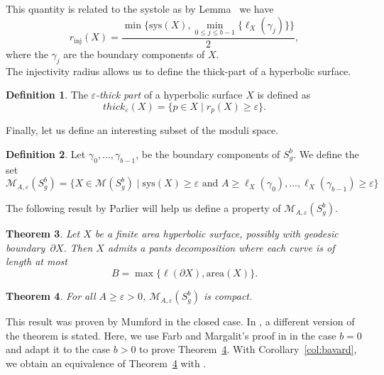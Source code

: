 \documentclass[a4paper,12pt]{article}
\newtheorem{theorem}{Theorem}[section]
\theoremstyle{definition}
\newtheorem{definition}[theorem]{Definition}
\theoremstyle{remark}
\begin{document}
This quantity is related to the systole as by Lemma~\cite[4.8 chap.I]{Hummel} we have 
\[
    r_{\mbox{inj}}(X)= \frac{\min\{ \mathrm{sys}(X) , \min_{0 \leqslant j \leqslant b-1}\{ \ell_X(\gamma_j) \} \}}{2}, 
\]
where the $\gamma_j$ are the boundary components of $X$.\\

The injectivity radius allows us to define the thick-part of a hyperbolic surface.
\begin{definition}
    The \emph{$\varepsilon$-thick part} of a hyperbolic surface $X$ is defined as
    \[
        thick_\varepsilon(X) = \{ p \in X \mid r_p(X) \geqslant \varepsilon  \}.
    \]
\end{definition}



Finally, let us define an interesting subset of the moduli space.

\begin{definition}
    Let $\gamma_0,...,\gamma_{b-1}$, be the boundary components of $S_g^b$. We define the set
    \[
        \mathcal{M}_{A, \varepsilon}(S_g^b) = \{X \in \mathcal{M}(S_g^b) \mid \mathrm{sys}(X) \geqslant \varepsilon \text{ and } A \geqslant \ell_X(\gamma_0),...,\ell_X(\gamma_{b-1}) \geqslant \varepsilon \}
    \]
\end{definition}

The following result by Parlier \cite{bers} will help us define a property of $\mathcal{M}_{A, \varepsilon}(S_g^b)$.

\begin{theorem}\label{theorem:Bers}
    Let $X$ be a finite area hyperbolic surface, possibly with geodesic boundary~$\partial X$. Then $X$ admits a pants decomposition where each curve is of length at most
    \[
        B = \max\{ \ell(\partial X), \mathrm{area}(X) \}.    
    \]
     
\end{theorem}

\begin{theorem}\label{theorem:mumford}
    For all $ A \geqslant \varepsilon > 0$, $\mathcal{M}_{A, \varepsilon}(S_g^b)$ is compact.
\end{theorem}

This result was proven by Mumford \cite{MumfordCriteria} in the closed case. In \cite{LengthSpectraTeichMetricBoundary}, a different version of the theorem is stated. Here, we use Farb and Margalit's proof in \cite[Chap.~12]{teich} in the case $b=0$ and adapt it to the case $b>0$ to prove Theorem~\ref{theorem:mumford}. With Corollary~\ref{col:bavard}, we obtain an equivalence of Theorem~\ref{theorem:mumford} with \cite[Theorem~4.1]{LengthSpectraTeichMetricBoundary}.
\end{document}
